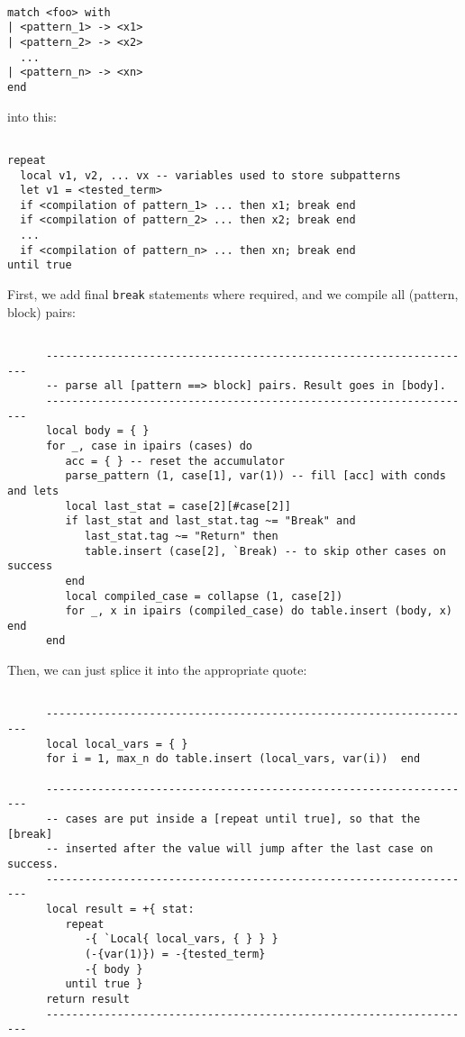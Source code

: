 \begin{Verbatim}[fontsize=\scriptsize]

match <foo> with
| <pattern_1> -> <x1>
| <pattern_2> -> <x2>
  ...
| <pattern_n> -> <xn>
end
\end{Verbatim}

\noindent into this:

\begin{Verbatim}[fontsize=\scriptsize]

repeat
  local v1, v2, ... vx -- variables used to store subpatterns
  let v1 = <tested_term>
  if <compilation of pattern_1> ... then x1; break end
  if <compilation of pattern_2> ... then x2; break end
  ...
  if <compilation of pattern_n> ... then xn; break end
until true
\end{Verbatim}

First, we add final \verb|break| statements where required, and we
compile all (pattern, block) pairs:

\begin{Verbatim}[fontsize=\scriptsize]

      -------------------------------------------------------------------
      -- parse all [pattern ==> block] pairs. Result goes in [body].
      -------------------------------------------------------------------
      local body = { }
      for _, case in ipairs (cases) do
         acc = { } -- reset the accumulator
         parse_pattern (1, case[1], var(1)) -- fill [acc] with conds and lets
         local last_stat = case[2][#case[2]]
         if last_stat and last_stat.tag ~= "Break" and 
            last_stat.tag ~= "Return" then
            table.insert (case[2], `Break) -- to skip other cases on success
         end
         local compiled_case = collapse (1, case[2])
         for _, x in ipairs (compiled_case) do table.insert (body, x) end
      end
\end{Verbatim}

\noindent Then, we can just splice it into the appropriate quote:

\begin{Verbatim}[fontsize=\scriptsize]

      -------------------------------------------------------------------
      local local_vars = { }
      for i = 1, max_n do table.insert (local_vars, var(i))  end
      
      -------------------------------------------------------------------
      -- cases are put inside a [repeat until true], so that the [break]
      -- inserted after the value will jump after the last case on success.
      -------------------------------------------------------------------
      local result = +{ stat: 
         repeat
            -{ `Local{ local_vars, { } } }
            (-{var(1)}) = -{tested_term}
            -{ body }
         until true }
      return result
      -------------------------------------------------------------------
\end{Verbatim}

